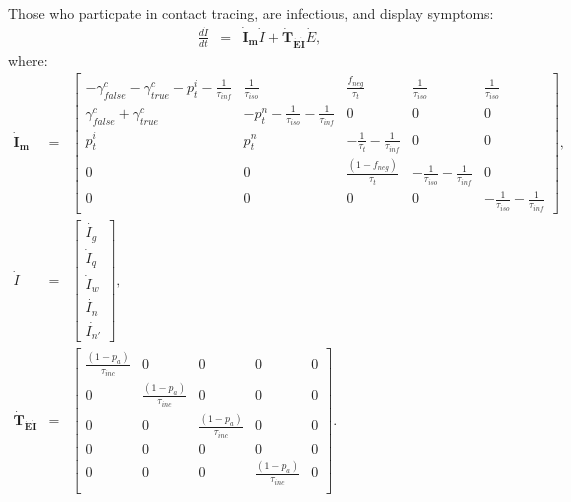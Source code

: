 \documentclass[notitlepage, superscriptaddress]{revtex4-2}
\begin{document}
Those who particpate in contact tracing, are infectious, and display symptoms:
\begin{eqnarray}
\frac{d\dot{I}}{dt} &=& \boldsymbol{\dot{I}_{m}}  \dot{I} + \boldsymbol{\dot{T}_{\dot{E}\dot{I}}}  \dot{E}, 
\end{eqnarray}
where:
%
\begin{eqnarray}
\boldsymbol{\dot{I}_{m}} &=&
\begin{bmatrix}
 -\gamma^{c}_{false} -\gamma^{c}_{true} - p^{i}_{t} -\frac{1}{\tau_{inf}} & \frac{1}{\tau_{iso}}  & \frac{f_{neg}}{\tau_{t}} & \frac{1}{\tau_{iso}} & \frac{1}{\tau_{iso}} \\
\gamma^{c}_{false} + \gamma^{c}_{true}    &  -p^{n}_{t}  - \frac{1}{\tau_{iso}} - \frac{1}{\tau_{inf}}      &  0    & 0  & 0\\
p^{i}_{t}     &  p^{n}_{t}                  &  -\frac{1}{\tau_{t}}  - \frac{1}{\tau_{inf}}  & 0 & 0\\
0 & 0 & \frac{(1-f_{neg})}{\tau_{t}}  & -\frac{1}{\tau_{iso}}  -  \frac{1}{\tau_{inf}} & 0 \\ 
0 & 0 & 0 & 0 & -\frac{1}{\tau_{iso}}  -  \frac{1}{\tau_{inf}}
\end{bmatrix}, \\ 
%
\dot{I} &=& 
\begin{bmatrix}
\dot{I_{g}} \\ \dot{I}_{q} \\ \dot{I}_{w}\\ \dot{I_{n}} \\ \dot{I_{n'}}
\end{bmatrix}, \\ 
%
\boldsymbol{\dot{T}_{\dot{E}\dot{I}}} &=&
\begin{bmatrix}
\frac{(1-p_{a})}{\tau_{inc}}  & 0                 & 0 & 0 & 0\\ 
 0          &  \frac{(1-p_{a})}{\tau_{inc}}  & 0 & 0 & 0 \\ 
 0          & 0                 &  \frac{(1-p_{a})}{\tau_{inc}} & 0 & 0 \\ 
0           & 0                 &  0 & 0 & 0 \\ 
0           & 0                 &  0 & \frac{(1-p_{a})}{\tau_{inc}} & 0 \\
\end{bmatrix}.
\end{eqnarray}
\end{document}
